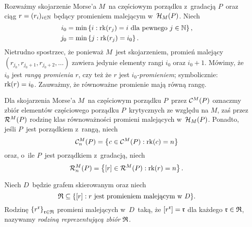 Rozważmy skojarzenie Morse'a $M$~na częściowym porządku z~gradacją $P$~oraz ciąg $r=(r_i)_{i\in\mathbb{N}}$ będący promieniem malejącym w~$\mathcal{H}_M(P)$. Niech
\begin{align*}i_0& =\min\left\{i:\operatorname{rk}(r_j)=i \text{ dla pewnego } j\in\mathbb{N}\right\},\\
j_0& =\min\left\{j:\operatorname{rk}(r_j)=i_0\right\}.
\end{align*}
Nietrudno spostrzec, że ponieważ $M$~jest skojarzeniem, promień malejący $\left(r_{j_0}, r_{j_0+1}, r_{j_0+2},\ldots\right)$ zawiera jedynie elementy rangi $i_0$ oraz $i_0+1$. Mówimy, że $i_0$ jest \textit{rangą promienia $r$}, czy też że $r$ jest \textit{$i_0$-promieniem}; symbolicznie: $\operatorname{rk}(r)=i_0$. Zauważmy, że równoważne promienie mają równą rangę.

Dla skojarzenia Morse'a $M$~na częściowym porządku $P$~przez $\mathcal{C}^M(P)$ oznaczmy zbiór elementów częściowego porządku $P$~krytycznych ze względu na $M$, zaś przez $\mathcal{R}^M(P)$ rodzinę klas równoważności promieni malejących w~$\mathcal{H}_M(P)$. Ponadto, jeśli $P$~jest porządkiem z~rangą, niech \[\mathcal{C}^M_n(P)=\left\{c\in\mathcal{C}^M(P):\operatorname{rk}(c)=n\right\}\] oraz, o~ile $P$~jest porządkiem z~gradacją, niech \[\mathcal{R}_n^M(P)=\left\{[r]\in\mathcal{R}^M(P):\operatorname{rk}(r)=n\right\}.\]

Niech $D$~będzie grafem skierowanym oraz niech \[\mathfrak{R}\subseteq\{[r]:r\text{ jest promieniem malejącym w } D\}.\] Rodzinę $\left\{r^{\mathfrak{r}}\right\}_{\mathfrak{r}\in\mathfrak{R}}$ promieni malejących w~$D$~taką, że $[r^{\mathfrak{r}}]=\mathfrak{r}$ dla każdego $\mathfrak{r}\in \mathfrak{R}$, nazywamy \textit{rodziną reprezentującą zbiór} $\mathfrak{R}$.

